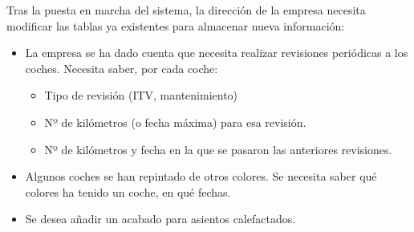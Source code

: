 \begin{homeworkProblem}

  Tras la puesta en marcha del sistema, la dirección de la empresa necesita modificar las tablas ya existentes para almacenar nueva información:
  
  \begin{itemize}
  \item La empresa se ha dado cuenta que necesita realizar revisiones
    periódicas a los coches. Necesita saber, por cada coche:
    \begin{itemize}
    \item Tipo de revisión (ITV, mantenimiento)
    \item Nº de kilómetros (o fecha máxima) para esa revisión.
    \item Nº de kilómetros y fecha en la que se pasaron las anteriores revisiones.
    \end{itemize}


  \item  Algunos coches se han repintado de otros colores. Se necesita saber qué colores ha tenido un coche, en qué fechas.
  \item  Se desea añadir un acabado para asientos calefactados.
  \end{itemize}
\end{homeworkProblem}

